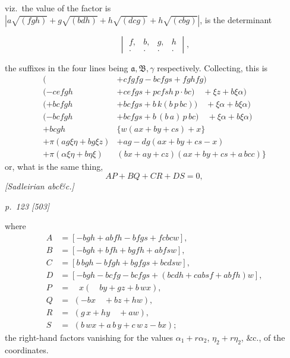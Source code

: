 \documentclass[11pt,a4paper]{book}
\begin{document}
viz.\ the value of the factor is $|a\sqrt{(fgh)} + g\sqrt{(bdh)} + h\sqrt{(dcg)} + h\sqrt{(cbg)}|$,
is the determinant

\[
\begin{vmatrix}
f, & b, & g, & h \\
. & . & . & .
\end{vmatrix},
\]

the suffixes in the four lines being $\mathfrak{a}, \mathfrak{B}, \gamma$ respectively.
Collecting, this is
\begin{align*}
(\quad & + cfgfg - bcfgs + fghfg)\\
(- cefgh & + cefgs + pcfsh\,p \cdot bc) \quad + \xi z + b\xi \alpha)\\
(+ bcfgh & + bcfgs + b\,k(b\,p\,bc)) \quad + \xi \alpha + b\xi \alpha)\\
(- bcfgh & + bcfgs + b\,(b\,a)\,p\,bc) \quad + \xi \alpha + b\xi \alpha)\\
+ bcgh\,& \{w(ax + by + cs) + x\}\\
+ \pi(ag\xi\eta + bg\xi z) & + ag - dg(ax + by + cs - x)\\
+ \pi(\alpha\xi\eta + b\eta\xi)\,& (bx + ay + cz)(ax + by + cs + a\,bcc)\}
\end{align*}
or, what is the same thing,
\[
A P + B Q + C R + D S = 0,
\]
\textit{[Sadleirian abc\&c.]}

\clearpage

\bigskip
\textit{p.~123 [503]}
\smallskip

\noindent
where
\begin{align*}
A &= [-bgh + abfh - bfgs + fcbcw],\\
B &= [-bgh + bfh + bgfh + abfsw],\\
C &= [b\,bgh - bfgh + bgfgs + bcdsw],\\
D &= [-bgh - bcfg - bcfgs + (bcdh + cabsf + abfh)w],\\
P &=\quad x ( \quad b y + g z + b\,wx),\\
Q &= \,\,(- bx \quad + b z + h w),\\
R &= \,\,(g\,x + h y \quad + a w),\\
S &= \,\,(b\,wx + a\,b\,y + c\,w\,z - bx);
\end{align*}
the right-hand factors vanishing for the values $\alpha_1 + r\alpha_2$, $\eta_2 + r\eta_2$, \&c., of the coordinates.
\end{document}

